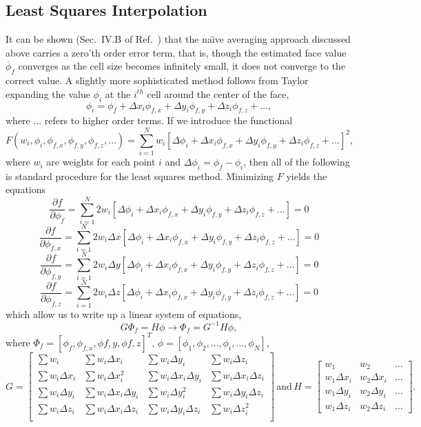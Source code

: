 \documentclass[]{article}
\newcommand{\p}{\partial}
\newcommand{\Eq}[1]{\begin{equation}#1\end{equation}}
\begin{document}
\subsection*{Least Squares Interpolation}
It can be shown (Sec.~IV.B of Ref.~\cite{Sozer2014}) that the na{\"\i}ve averaging approach discussed above carries a zero'th order error term, that is, though the estimated face value $\overline{\phi}_f $ converges as the cell size becomes infinitely small, it does not converge to the correct value. A slightly more sophisticated method follows from Taylor expanding the value $\phi_i$ at the $i^{th}$ cell around the center of the face,
\Eq{\phi_i = \phi_f + \Delta x_i\phi_{f,x} + \Delta y_i\phi_{f,y} + \Delta z_i\phi_{f,z} + \dots,}
where $\dots$ refers to higher order terms. If we introduce the functional
\Eq{F(w_i,\phi_i,\phi_{f,x},\phi_{f,y},\phi_{f,z},\dots) = \sum_{i=1}^N w_i\left[\Delta\phi_i + \Delta x_i\phi_{f,x} + \Delta y_i\phi_{f,y} + \Delta z_i\phi_{f,z} + \dots\right]^2,}
where $w_i$ are weights for each point $i$ and $\Delta\phi_i = \phi_f - \phi_i$, then all of the following is standard procedure for the least squares method. Minimizing $F$ yields the equations
\Eq{\frac{\p f}{\p \phi_f} =  \sum_{i=1}^N 2 w_i\left[\Delta\phi_i + \Delta x_i\phi_{f,x} + \Delta y_i\phi_{f,y} + \Delta z_i\phi_{f,z} + \dots\right] = 0}
\Eq{\frac{\p f}{\p \phi_{f,x}} =  \sum_{i=1}^N 2 w_i\Delta x\left[\Delta\phi_i + \Delta x_i\phi_{f,x} + \Delta y_i\phi_{f,y} + \Delta z_i\phi_{f,z} + \dots\right] = 0}
\Eq{\frac{\p f}{\p \phi_{f,y}} =  \sum_{i=1}^N 2 w_i\Delta y\left[\Delta\phi_i + \Delta x_i\phi_{f,x} + \Delta y_i\phi_{f,y} + \Delta z_i\phi_{f,z} + \dots\right] = 0}
\Eq{\frac{\p f}{\p \phi_{f,z}} =  \sum_{i=1}^N 2 w_i\Delta z\left[\Delta\phi_i + \Delta x_i\phi_{f,x} + \Delta y_i\phi_{f,y} + \Delta z_i\phi_{f,z} + \dots\right] = 0}
which allow us to write up a linear system of equations,
\Eq{G\Phi_f = H\phi \rightarrow \Phi_f = G^{-1}H\phi,}
where $\Phi_f = [\phi_f,\phi_{f,x},\phi{f,y},\phi{f,z}]^T$, $\phi = [\phi_1,\phi_2,\dots,\phi_i,\dots,\phi_N]$,
\Eq{G =
\begin{bmatrix}
    \sum w_i       & \sum w_i \Delta x_i & \sum w_i \Delta y_i & \sum w_i \Delta z_i \\
    \sum w_i \Delta x_i      & \sum w_i \Delta x^2_i & \sum w_i \Delta x_i\Delta y_i & \sum w_i \Delta x_i\Delta z_i \\
    \sum w_i  \Delta y_i     & \sum w_i \Delta x_i\Delta y_i & \sum w_i \Delta y^2_i & \sum w_i \Delta y_i\Delta z_i \\
    \sum w_i  \Delta z_i     & \sum w_i \Delta x_i\Delta z_i & \sum w_i \Delta y_i\Delta z_i & \sum w_i \Delta z^2_i \\
\end{bmatrix}
\, \mathrm{and}\, H = 
\begin{bmatrix}
    w_{1} & w_{2} & \dots  \\
    w_{1}\Delta x_i & w_{2}\Delta x_i &  \dots \\
    w_{1}\Delta y_i & w_{2}\Delta y_i &  \dots \\
    w_{1}\Delta z_i & w_{2}\Delta z_i &  \dots
\end{bmatrix}.}
\end{document}
